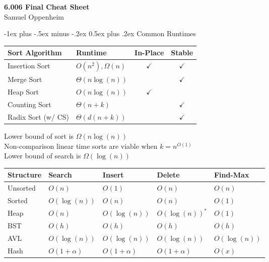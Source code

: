 \documentclass[10pt,landscape]{article}
\makeatletter
\renewcommand{\section}{\@startsection{section}{1}{0mm}%
                                {-1ex plus -.5ex minus -.2ex}%
                                {0.5ex plus .2ex}%
                                {\normalfont\large\bfseries}}
\makeatother
\begin{document}
\raggedright
\footnotesize
\begin{multicols}{3}


\setlength{\premulticols}{1pt}
\setlength{\postmulticols}{1pt}
\setlength{\multicolsep}{1pt}
\setlength{\columnsep}{2pt}

\begin{center}
     \Large{\textbf{6.006 Final Cheat Sheet}} \\
     \large{Samuel Oppenheim} \\
\end{center}


\section{Common Runtimes}
\begin{tabular}{l | l | c | c}
Sort Algorithm & Runtime & In-Place & Stable \\ \hline
Insertion Sort & $O(n^2), \Omega(n)$ & $\checkmark$ & $\checkmark$ \\
Merge Sort & $\Theta(n \log(n))$ & \ & $\checkmark$ \\
Heap Sort & $O(n \log(n))$ & $\checkmark $ & \ \\
Counting Sort & $\Theta(n+k)$ & \ & $\checkmark$ \\
Radix Sort (w/ CS) & $\Theta(d(n+k))$ & \ & $\checkmark$ \\
\end{tabular}

Lower bound of sort is $\Omega(n \log(n))$ \\
Non-comparison linear time sorts are viable when $k = n^{O(1)}$ \\
Lower bound of search is $\Omega(\log(n))$ 

\begin{tabular}{l | l | l | l | l}
Structure & Search & Insert & Delete & Find-Max \\ \hline
Unsorted & $O(n)$ & $O(1)$ & $O(n)$ & $O(n)$ \\
Sorted & $O(\log(n))$ & $O(n)$ & $O(n)$ & $O(1)$ \\
Heap & $O(n)$ & $O(\log(n))$ & $O(\log(n))^\ast$ & $O(1)$ \\
BST & $O(h)$ & $O(h)$ & $O(h)$ & $O(h)$ \\
AVL & $O(\log(n))$ & $O(\log(n))$ & $O(\log(n))$ & $O(\log(n))$ \\
Hash & $O(1 + \alpha)$ & $O(1 + \alpha)$ & $O(1 + \alpha)$ & $O(x)$ \\
\end{tabular}


\end{multicols}
\end{document}
